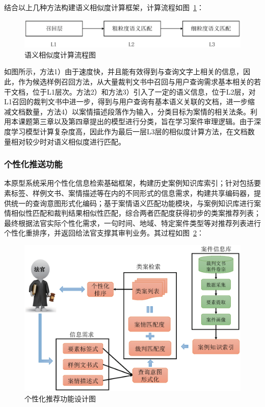 结合以上几种方法构建语义相似度计算框架，计算流程如图~\ref{fig:sys_similarity2}：
\begin{figure}[htbp]%
    \centering
    \includegraphics[scale=0.5, clip=true]{./sources/sys_similarity2.eps}
    \caption{\label{fig:sys_similarity2}语义相似度计算流程图}
\end{figure}

如图所示，方法1）由于速度快，并且能有效得到与查询文字上相关的信息，因此，作为候选样例召回方法，从大量裁判文书中召回与用户查询需求基本相关的若干文档，位于L1层次。方法2）和方法3）引入了一定的语义信息，位于L2层，对L1召回的裁判文书中进一步，得到与用户查询有基本语义关联的文档，进一步缩减文档数量，方法4）以案情描述段落作为输入，分类目标为案情的相关法条。利用本课题第三章以及第四章提出的模型进行分类，旨在学习案件审理逻辑。由于深度学习模型计算复杂度高，因此作为最后一层L3层的相似度计算方法，在文档数量相对较少时对语义相似度进行匹配。


\subsubsection{个性化推送功能}
本原型系统采用个性化信息检索基础框架，构建历史案例知识库索引；针对包括要素标签、样例文书、案情描述等在内的不同形式的信息需求，构建共享编码器，提供统一的查询意图形式化编码；基于案情语义匹配功能模块，与案例知识库进行案情相似性匹配和裁判结果相似性匹配，综合两者匹配度获得初步的类案推荐列表；最终根据法官实际个性化需求，一句时间、地域、特定案件类型等对推荐列表进行个性化重排序，并返回给法官支撑其审判业务。其过程如图~\ref{fig:sys_recomm}：
\begin{figure}[htbp]%
    \centering
    \includegraphics[scale=0.5, clip=true]{./sources/sys_recomm.eps}
    \caption{\label{fig:sys_recomm}个性化推荐功能设计图}
\end{figure}


